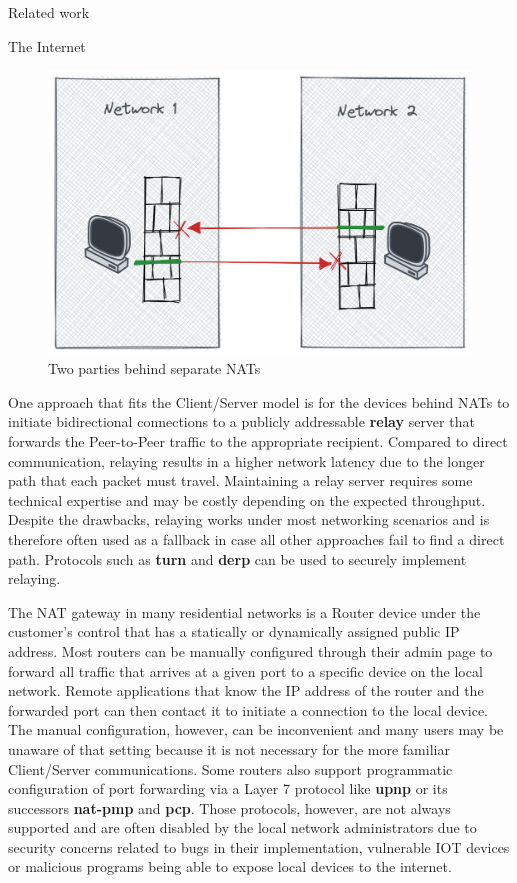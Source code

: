 \begin{frame}[fragile]{Related work}
\begin{block}{The Internet}
\begin{figure}
\centering
\includegraphics[width=\textwidth,height=0.25\textheight]{thesis/../figures/nat-intro.png}
\caption{Two parties behind separate NATs\label{nat-intro}}
\end{figure}

One approach that fits the Client/Server model is for the devices behind
NATs to initiate bidirectional connections to a publicly addressable
\textbf{relay} server that forwards the Peer-to-Peer traffic to the
appropriate recipient. Compared to direct communication, relaying
results in a higher network latency due to the longer path that each
packet must travel. Maintaining a relay server requires some technical
expertise and may be costly depending on the expected throughput.
Despite the drawbacks, relaying works under most networking scenarios
and is therefore often used as a fallback in case all other approaches
fail to find a direct path. Protocols such as \textbf{\acrfull{turn}}
\autocite{turnRFC} and \textbf{\acrfull{derp}} \autocite{derpDocs} can
be used to securely implement relaying.

The NAT gateway in many residential networks is a Router device under
the customer's control that has a statically or dynamically assigned
public IP address. Most routers can be manually configured through their
admin page to forward all traffic that arrives at a given port to a
specific device on the local network. Remote applications that know the
IP address of the router and the forwarded port can then contact it to
initiate a connection to the local device. The manual configuration,
however, can be inconvenient and many users may be unaware of that
setting because it is not necessary for the more familiar Client/Server
communications. Some routers also support programmatic configuration of
port forwarding via a Layer 7 protocol like \textbf{\gls{upnp}} or its
successors \textbf{\gls{nat-pmp}} and \textbf{\gls{pcp}}. Those
protocols, however, are not always supported and are often disabled by
the local network administrators due to security concerns related to
bugs in their implementation, vulnerable IOT devices or malicious
programs being able to expose local devices to the internet.


\end{block}
\end{frame}
